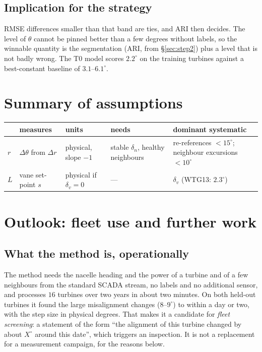 \documentclass[11pt,a4paper]{article}
\theoremstyle{remark}
\newcommand{\dg}{^{\circ}}
\begin{document}
\subsection{Implication for the strategy}
RMSE differences smaller than that band are ties, and ARI then decides. The
level of $\theta$ cannot be pinned better than a few degrees without labels, so
the winnable quantity is the segmentation (ARI, from \S\ref{sec:step2}) plus a
level that is not badly wrong. The T0 model scores $2.2\dg$ on the training
turbines against a best-constant baseline of $3.1$--$6.1\dg$.

\section{Summary of assumptions}\label{sec:summary}
\begin{center}\small
\begin{tabular}{@{}lp{3.6cm}p{2.6cm}p{2.4cm}p{4.2cm}@{}}
\toprule
 & measures & units & needs & dominant systematic \\
\midrule
$r$ & $\Delta\theta$ from $\Delta r$ & physical, slope $-1$ & stable $\delta_n$, healthy neighbours & re-references $<15\dg$; neighbour excursions $<10\dg$ \\
$L$ & vane set-point $s$ & physical if $\delta_v=0$ & --- & $\delta_v$ (WTG13: $2.3\dg$) \\
\bottomrule
\end{tabular}
\end{center}

\section{Outlook: fleet use and further work}\label{sec:outlook}

\subsection{What the method is, operationally}
The method needs the nacelle heading and the power of a turbine and of a few
neighbours from the standard SCADA stream, no labels and no additional sensor,
and processes $16$ turbines over two years in about two minutes. On both
held-out turbines it found the large misalignment changes ($8$--$9\dg$) to
within a day or two, with the step size in physical degrees. That makes it a
candidate for \emph{fleet screening}: a statement of the form ``the alignment
of this turbine changed by about $X\dg$ around this date'', which triggers an
inspection. It is not a replacement for a measurement campaign, for the
reasons below.
\end{document}
